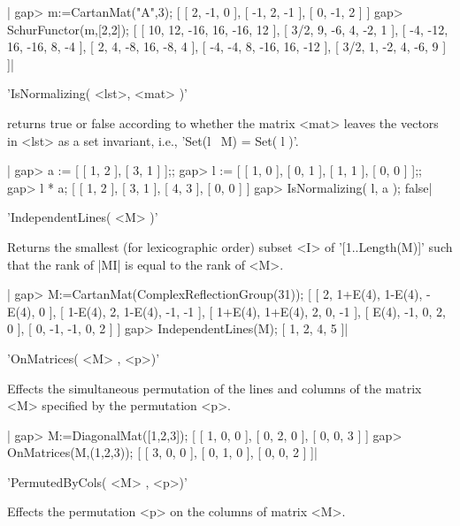 |    gap> m:=CartanMat("A",3);
    [ [ 2, -1, 0 ], [ -1, 2, -1 ], [ 0, -1, 2 ] ]
    gap> SchurFunctor(m,[2,2]);
    [ [ 10, 12, -16, 16, -16, 12 ], [ 3/2, 9, -6, 4, -2, 1 ],
      [ -4, -12, 16, -16, 8, -4 ], [ 2, 4, -8, 16, -8, 4 ],
      [ -4, -4, 8, -16, 16, -12 ], [ 3/2, 1, -2, 4, -6, 9 ] ]|


'IsNormalizing( <lst>, <mat> )'

returns true or  false according to whether  the matrix  <mat> leaves the
vectors in <lst> as a set invariant, i.e., 'Set(l \*\ M) = Set( l )'.

|    gap> a := [ [ 1, 2 ], [ 3, 1 ] ];;
    gap> l := [ [ 1, 0 ], [ 0, 1 ], [ 1, 1 ], [ 0, 0 ] ];;
    gap> l * a;
    [ [ 1, 2 ], [ 3, 1 ], [ 4, 3 ], [ 0, 0 ] ]
    gap> IsNormalizing( l, a );
    false|


'IndependentLines( <M> )'

Returns the smallest (for lexicographic order) subset <I> of '[1..Length(M)]'
such that the rank of |M{I}| is equal to the rank of <M>.

|    gap> M:=CartanMat(ComplexReflectionGroup(31));
    [ [ 2, 1+E(4), 1-E(4), -E(4), 0 ], [ 1-E(4), 2, 1-E(4), -1, -1 ],
      [ 1+E(4), 1+E(4), 2, 0, -1 ], [ E(4), -1, 0, 2, 0 ],
      [ 0, -1, -1, 0, 2 ] ]
    gap> IndependentLines(M);
    [ 1, 2, 4, 5 ]|

%
%

'OnMatrices( <M> , <p>)'

Effects the simultaneous permutation of the lines and columns of the matrix
<M> specified by the permutation <p>.

|    gap> M:=DiagonalMat([1,2,3]);
    [ [ 1, 0, 0 ], [ 0, 2, 0 ], [ 0, 0, 3 ] ]
    gap> OnMatrices(M,(1,2,3));
    [ [ 3, 0, 0 ], [ 0, 1, 0 ], [ 0, 0, 2 ] ]|

%
%

'PermutedByCols( <M> , <p>)'

Effects the permutation <p> on the columns of matrix <M>.

